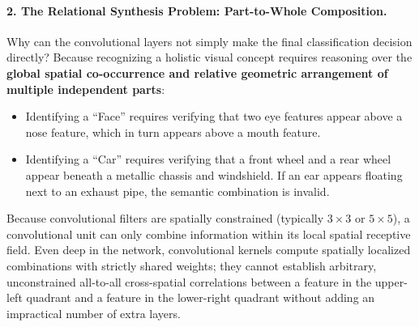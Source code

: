 \paragraph{2. The Relational Synthesis Problem: Part-to-Whole Composition.}
Why can the convolutional layers not simply make the final classification decision directly?
Because recognizing a holistic visual concept requires reasoning over the \textbf{global spatial co-occurrence and relative geometric arrangement of multiple independent parts}:
\begin{itemize}[leftmargin=*]
  \item Identifying a ``Face'' requires verifying that two eye features appear above a nose feature, which in turn appears above a mouth feature.
  \item Identifying a ``Car'' requires verifying that a front wheel and a rear wheel appear beneath a metallic chassis and windshield. If an ear appears floating next to an exhaust pipe, the semantic combination is invalid.
\end{itemize}
Because convolutional filters are spatially constrained (typically $3 \times 3$ or $5 \times 5$), a convolutional unit can only combine information within its local spatial receptive field. Even deep in the network, convolutional kernels compute spatially localized combinations with strictly shared weights; they cannot establish arbitrary, unconstrained all-to-all cross-spatial correlations between a feature in the upper-left quadrant and a feature in the lower-right quadrant without adding an impractical number of extra layers.


